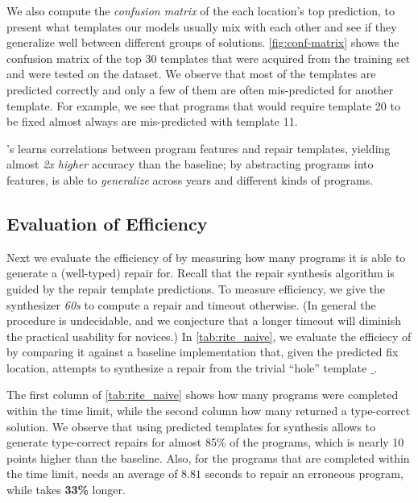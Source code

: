 %
We also compute the \emph{confusion matrix} of the each location's 
top prediction, to present what templates our models usually mix 
with each other and see if they generalize well between different 
groups of solutions. 
%
\autoref{fig:conf-matrix} shows the confusion matrix of the 
top 30 templates that were acquired from the training set 
and were tested on the \FALL dataset.
%
We observe that most of the templates are predicted correctly 
and only a few of them are often mis-predicted for another template. 
%
For example, we see that programs that would require template 20 
to be fixed almost always are mis-predicted with template 11.


\begin{framed}
  \noindent \toolname's learns correlations between program features and repair 
  templates, yielding almost \emph{2x higher} accuracy than the baseline;
  by abstracting programs into features, \toolname is able 
  to \emph{generalize} across years and different kinds of programs.
\end{framed}


\subsection{Evaluation of Efficiency}
\label{sec:eval:efficiency}
\label{subsec:eval:man_rep_qual_eval}

Next we evaluate the efficiency of \toolname by measuring how many 
programs it is able to generate a (well-typed) repair for.
%
Recall that the repair synthesis algorithm is guided by the 
repair template predictions.
%
To measure efficiency, we give the synthesizer \emph{60s} to 
compute a repair and timeout otherwise. (In general the procedure 
is undecidable, and we conjecture that a longer timeout will diminish 
the practical usability for novices.)
%
In \autoref{tab:rite_naive}, we evaluate the efficiecy of \toolname
by comparing it against a baseline \naive implementation that, given 
the predicted fix location, attempts to synthesize a repair from the 
trivial ``hole'' template $\_$.

The first column of \autoref{tab:rite_naive} shows how many 
programs were completed within the time limit, while the second 
column how many returned a type-correct solution. 
%
We observe that using predicted templates for synthesis allows 
\toolname to generate type-correct repairs for almost 85\% of 
the programs, which is nearly 10 points higher than the \naive 
baseline. Also, for the programs that are completed within 
the time limit, \toolname needs an average of $8.81$ seconds 
to repair an erroneous program, while \naive takes 
\textbf{33\%} longer.

